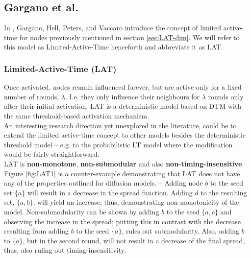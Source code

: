 \documentclass[twocolumn, 10pt]{article}
\begin{document}
\subsection{Gargano et al. \cite{gargano}}
In \cite{gargano}, Gargano, Hell, Peters, and Vaccaro introduce the concept of limited active-time for nodes previously mentioned in section \ref{sec:LAT-dim}. We will refer to this model as Limited-Active-Time henceforth and abbreviate it as LAT.
\subsubsection{Limited-Active-Time (LAT)}
Once activated, nodes remain influenced forever, but are active only for a fixed number of rounds, $\lambda$. I.e. they only influence their neighbours for $\lambda$ rounds only after their initial activation. LAT is a deterministic model based on DTM with the same threshold-based activation mechanism. \\
An interesting research direction yet unexplored in the literature, could be to extend the limited active-time concept to other models besides the deterministic threshold model -- e.g. to the probabilistic LT model where the modification would be fairly straightforward. \\
LAT is \textbf{non-monotone}, \textbf{non-submodular} and also \textbf{non-timing-insensitive}. Figure \ref{fig:LAT1} is a counter-example demonstrating that LAT does not have any of the properties outlined for diffusion models. -- Adding node $b$ to the seed set $\{a\}$ will result in a decrease in the spread function. Adding $d$ to the resulting set, $\{a, b\}$, will yield an increase; thus, demonstrating non-monotonicity of the model. Non-submodularity can be shown by adding $b$ to the seed $\{a, c\}$ and observing the increase in the spread; putting this in contrast with the decrease resulting from adding $b$ to the seed $\{a\}$, rules out submodularity. Also, adding $b$ to $\{a\}$, but in the second round, will not result in a decrease of the final spread, thus, also ruling out timing-insensitivity.
\end{document}

